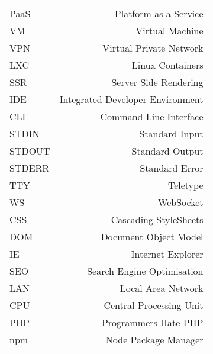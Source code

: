 \begin{table}[h]
\begin{tabulary}{\textwidth}{l r}
        PaaS & Platform as a Service\\
        
        VM & Virtual Machine\\
        
        VPN & Virtual Private Network\\
        
        LXC & Linux Containers\\
        
        SSR & Server Side Rendering\\
        
        IDE & Integrated Developer Environment\\
        
        CLI & Command Line Interface \\
        
        STDIN & Standard Input\\
        
        STDOUT & Standard Output\\
        
        STDERR & Standard Error\\
        
        TTY & Teletype\\
        
        WS & WebSocket\\
        
        CSS & Cascading StyleSheets\\
        
        DOM & Document Object Model\\
        
        IE & Internet Explorer\\
        
        SEO & Search Engine Optimisation\\
        
        LAN & Local Area Network\\
        
        CPU & Central Processing Unit\\
        
        PHP & Programmers Hate PHP\\
        
        npm & Node Package Manager
    \end{tabulary}
\end{table}
\pagebreak
